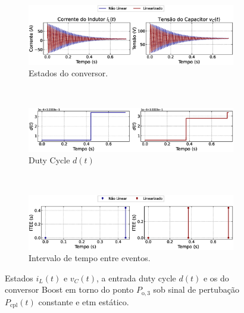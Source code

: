 \begin{figure}[H]
  \centering
  \captionsetup{justification=centering}
  \begin{subfigure}{1.\textwidth}
    \centering
    \includegraphics[width=1.\textwidth]{figuras/static-etm/boost/sim1/op1/result.eps}
    \caption{Estados do conversor.}
    \label{fig:boost_converter_constant_pcpl_static_etm_op1_duty_a}
  \end{subfigure}
  \\[6pt]
  \begin{subfigure}{1.\textwidth}
    \centering
    \includegraphics[width=1.\textwidth]{figuras/static-etm/boost/sim1/op1/duty-cycle.eps}
    \caption{Duty Cycle $d(t)$}
    \label{fig:boost_converter_constant_pcpl_static_etm_op1_duty_b}
  \end{subfigure}
  \\[6pt]
  \begin{subfigure}{1.\textwidth}
    \centering
    \includegraphics[width=1.\textwidth]{figuras/static-etm/boost/sim1/op1/inter-event-times.eps}
    \caption{Intervalo de tempo entre eventos.}
    \label{fig:boost_converter_constant_pcpl_static_etm_op1_duty_c}
  \end{subfigure}
  \caption{Estados $i_L(t)$ e $v_C(t)$, a entrada duty cycle $d(t)$ e os  do conversor Boost em torno do ponto $P_{\mathrm{o}, 3}$ sob sinal de pertubação $P_{\mathrm{cpl}}(t)$ constante e \acrshort{etm} estático.}
\end{figure}

